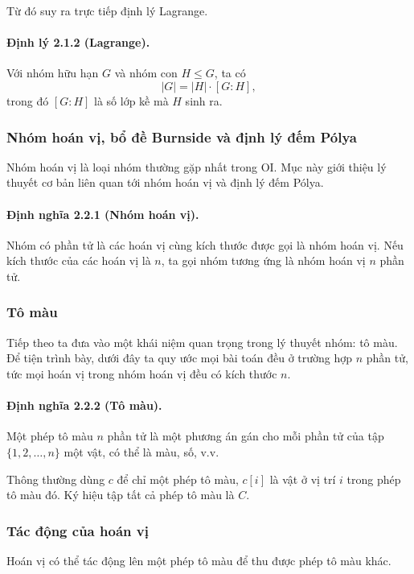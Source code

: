 \documentclass[11pt]{article}
\begin{document}
Từ đó suy ra trực tiếp định lý Lagrange.

\paragraph{Định lý 2.1.2 (Lagrange).}
Với nhóm hữu hạn \(G\) và nhóm con \(H\le G\), ta có
\[
  |G|=|H|\cdot [G:H],
\]
trong đó \([G:H]\) là số lớp kề mà \(H\) sinh ra.

\subsubsection{Nhóm hoán vị, bổ đề Burnside và định lý đếm Pólya}

Nhóm hoán vị là loại nhóm thường gặp nhất trong OI. Mục này giới thiệu lý
thuyết cơ bản liên quan tới nhóm hoán vị và định lý đếm Pólya.

\paragraph{Định nghĩa 2.2.1 (Nhóm hoán vị).}
Nhóm có phần tử là các hoán vị cùng kích thước được gọi là nhóm hoán vị. Nếu
kích thước của các hoán vị là \(n\), ta gọi nhóm tương ứng là nhóm hoán vị
\(n\) phần tử.

\subsubsection{Tô màu}

Tiếp theo ta đưa vào một khái niệm quan trọng trong lý thuyết nhóm: tô màu. Để
tiện trình bày, dưới đây ta quy ước mọi bài toán đều ở trường hợp \(n\) phần
tử, tức mọi hoán vị trong nhóm hoán vị đều có kích thước \(n\).

\paragraph{Định nghĩa 2.2.2 (Tô màu).}
Một phép tô màu \(n\) phần tử là một phương án gán cho mỗi phần tử của tập
\(\{1,2,\ldots,n\}\) một vật, có thể là màu, số, v.v.

Thông thường dùng \(c\) để chỉ một phép tô màu, \(c[i]\) là vật ở vị trí \(i\)
trong phép tô màu đó. Ký hiệu tập tất cả phép tô màu là \(C\).

\subsubsection{Tác động của hoán vị}

Hoán vị có thể tác động lên một phép tô màu để thu được phép tô màu khác.
\end{document}
